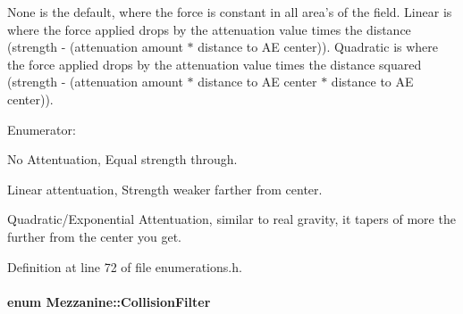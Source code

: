 None is the default, where the force is constant in all area's of the field. Linear is where the force applied drops by the attenuation value times the distance (strength -\/ (attenuation amount $\ast$ distance to AE center)). Quadratic is where the force applied drops by the attenuation value times the distance squared (strength -\/ (attenuation amount $\ast$ distance to AE center $\ast$ distance to AE center)). \begin{Desc}
\item[Enumerator: ]\par
\begin{description}
\item[{\em 
\hypertarget{namespaceMezzanine_a2d10a79e11a2031df10af540eede12faa548ff9c1d108b12ea6323d39c41856f5}{
Att\_\-None}
\label{namespaceMezzanine_a2d10a79e11a2031df10af540eede12faa548ff9c1d108b12ea6323d39c41856f5}
}]No Attentuation, Equal strength through. \item[{\em 
\hypertarget{namespaceMezzanine_a2d10a79e11a2031df10af540eede12faaaecc4b0547a61e5b2abd5401182c9470}{
Att\_\-Linear}
\label{namespaceMezzanine_a2d10a79e11a2031df10af540eede12faaaecc4b0547a61e5b2abd5401182c9470}
}]Linear attentuation, Strength weaker farther from center. \item[{\em 
\hypertarget{namespaceMezzanine_a2d10a79e11a2031df10af540eede12faa7f0c2854461a843af7eb21c036375e83}{
Att\_\-Quadratic}
\label{namespaceMezzanine_a2d10a79e11a2031df10af540eede12faa7f0c2854461a843af7eb21c036375e83}
}]Quadratic/Exponential Attentuation, similar to real gravity, it tapers of more the further from the center you get. \end{description}
\end{Desc}



Definition at line 72 of file enumerations.h.

\hypertarget{namespaceMezzanine_a475283a31c5df11f18e059953f32ace2}{
\paragraph[{CollisionFilter}]{\setlength{\rightskip}{0pt plus 5cm}enum {\bf Mezzanine::CollisionFilter}}\hfill}
\label{namespaceMezzanine_a475283a31c5df11f18e059953f32ace2}


